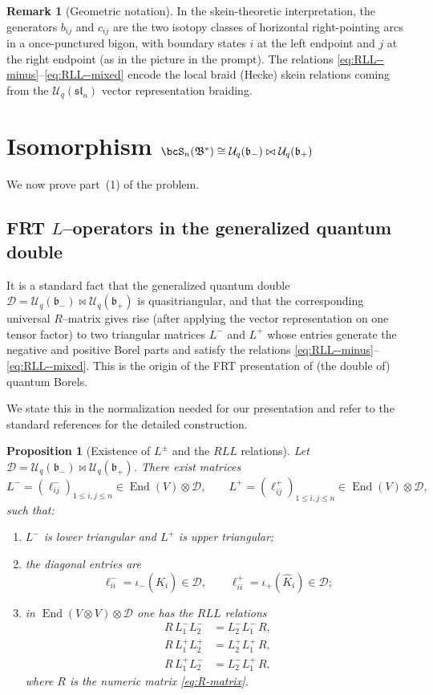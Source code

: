 \documentclass[11pt]{article}
\newtheorem{proposition}{Proposition}
\theoremstyle{definition}
\newtheorem{remark}{Remark}
\newcommand{\Uc}{\mathcal{U}}
\newcommand{\fsl}{\mathfrak{sl}}
\newcommand{\fb}{\mathfrak{b}}
\newcommand{\bipr}{\bowtie}
\newcommand{\tensor}{\otimes}
\newcommand{\Khat}{\widehat{K}}
\DeclareMathOperator{\End}{End}
\begin{document}
\begin{remark}[Geometric notation]
In the skein-theoretic interpretation, the generators $b_{ij}$ and $c_{ij}$ are the two isotopy classes of horizontal right-pointing arcs in a once-punctured bigon, with boundary states $i$ at the left endpoint and $j$ at the right endpoint (as in the picture in the prompt). The relations \eqref{eq:RLL--minus}--\eqref{eq:RLL--mixed} encode the local braid (Hecke) skein relations coming from the $\Uc_q(\fsl_n)$ vector representation braiding.
\end{remark}


\section{Isomorphism $\bcS_n(\mathfrak B^*)\cong \Uc_q(\fb_-)\bipr \Uc_q(\fb_+)$}

We now prove part~(1) of the problem.

\subsection{FRT $L$--operators in the generalized quantum double}

It is a standard fact that the generalized quantum double $\mathcal{D}=\Uc_q(\fb_-)\bipr \Uc_q(\fb_+)$ is quasitriangular, and that the corresponding universal $R$--matrix gives rise (after applying the vector representation on one tensor factor) to two triangular matrices $L^-$ and $L^+$ whose entries generate the negative and positive Borel parts and satisfy the relations \eqref{eq:RLL--minus}--\eqref{eq:RLL--mixed}. This is the origin of the FRT presentation of (the double of) quantum Borels.

We state this in the normalization needed for our presentation and refer to the standard references for the detailed construction.

\begin{proposition}[Existence of $L^\pm$ and the $RLL$ relations]\label{prop:L-operators}
Let $\mathcal{D}=\Uc_q(\fb_-)\bipr \Uc_q(\fb_+)$. There exist matrices
\[
L^-=(\ell^-_{ij})_{1\le i,j\le n}\in \End(V)\tensor \mathcal{D},
\qquad
L^+=(\ell^+_{ij})_{1\le i,j\le n}\in \End(V)\tensor \mathcal{D},
\]
such that:
\begin{enumerate}[label=(\roman*)]
\item $L^-$ is lower triangular and $L^+$ is upper triangular;
\item the diagonal entries are
\[
\ell^-_{ii}=\iota_-(\Khat_i)\in \mathcal{D},\qquad \ell^+_{ii}=\iota_+(\Khat_i)\in \mathcal{D};
\]
\item in $\End(V\tensor V)\tensor \mathcal{D}$ one has the $RLL$ relations
\begin{align*}
R\,L^-_1L^-_2 &= L^-_2L^-_1\,R,\\
R\,L^+_1L^+_2 &= L^+_2L^+_1\,R,\\
R\,L^+_1L^-_2 &= L^-_2L^+_1\,R,
\end{align*}
where $R$ is the numeric matrix \eqref{eq:R-matrix}.
\end{enumerate}
\end{proposition}
\end{document}
